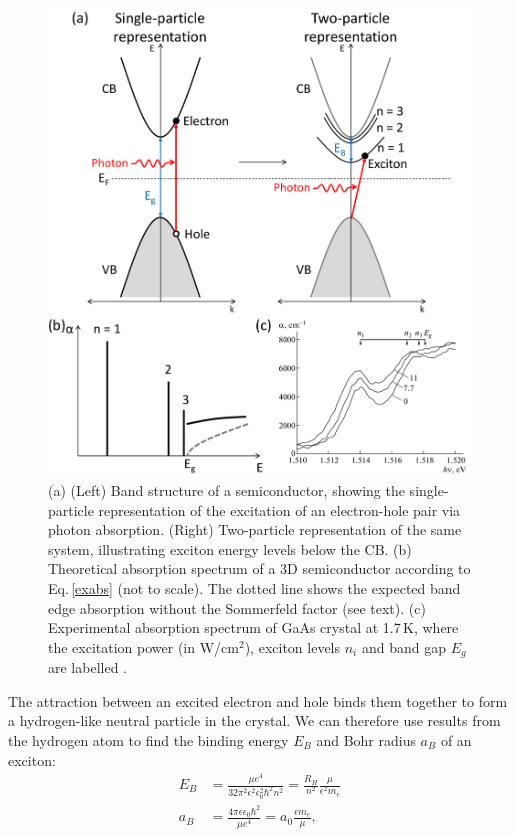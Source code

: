 \begin{figure}[h!] 
\centering    
\includegraphics[width=\textwidth]{Fig1}
\caption{(a) (Left) Band structure of a semiconductor, showing the single-particle representation of the excitation of an electron-hole pair via photon absorption. (Right) Two-particle representation of the same system, illustrating exciton energy levels below the CB. (b) Theoretical absorption spectrum of a 3D semiconductor according to Eq.\,\ref{exabs} (not to scale). The dotted line shows the expected band edge absorption without the Sommerfeld factor (see text). (c) Experimental absorption spectrum of GaAs crystal at 1.7\,K, where the excitation power (in W/cm$^2$), exciton levels $n_i$ and band gap $E_g$ are labelled \cite{Vaganov2013}.}
\label{2Fig1}
\end{figure}
The attraction between an excited electron and hole binds them together to form a hydrogen-like neutral particle in the crystal. We can therefore use results from the hydrogen atom to find the binding energy $E_B$ and Bohr radius $a_B$ of an exciton:
\begin{subequations}
\label{ex3D}
\begin{align}
E_B &=\frac{\mu e^4}{32\pi^2\epsilon^2\epsilon_0^2\hbar^2n^2} = \frac{R_H}{n^2}\frac{\mu}{\epsilon^2 m_e} \label{exbinding3D}\\
a_B &= \frac{4\pi\epsilon\epsilon_0\hbar^2}{\mu e^4}=a_0\frac{\epsilon m_e}{\mu} \label{exrad3D},
\end{align}
\end{subequations}
